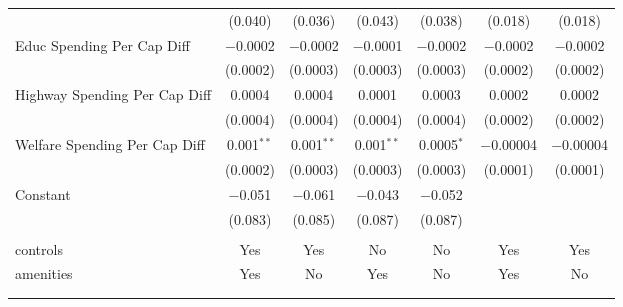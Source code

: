 \begin{table}[!htbp]
\begin{tabular}{@{\extracolsep{5pt}}lcccccc}
  & (0.040) & (0.036) & (0.043) & (0.038) & (0.018) & (0.018) \\ 
  Educ Spending Per Cap Diff & $-$0.0002 & $-$0.0002 & $-$0.0001 & $-$0.0002 & $-$0.0002 & $-$0.0002 \\ 
  & (0.0002) & (0.0003) & (0.0003) & (0.0003) & (0.0002) & (0.0002) \\ 
  Highway Spending Per Cap Diff & 0.0004 & 0.0004 & 0.0001 & 0.0003 & 0.0002 & 0.0002 \\ 
  & (0.0004) & (0.0004) & (0.0004) & (0.0004) & (0.0002) & (0.0002) \\ 
  Welfare Spending Per Cap Diff & 0.001$^{**}$ & 0.001$^{**}$ & 0.001$^{**}$ & 0.0005$^{*}$ & $-$0.00004 & $-$0.00004 \\ 
  & (0.0002) & (0.0003) & (0.0003) & (0.0003) & (0.0001) & (0.0001) \\ 
  Constant & $-$0.051 & $-$0.061 & $-$0.043 & $-$0.052 &  &  \\ 
  & (0.083) & (0.085) & (0.087) & (0.087) &  &  \\ 
 \hline \\[-1.8ex] 
controls & Yes & Yes & No & No & Yes & Yes \\ 
amenities & Yes & No & Yes & No & Yes & No \\ 
\hline \\[-1.8ex] 
\hline 
\hline \\[-1.8ex] 
\end{tabular} 
\end{table} 
